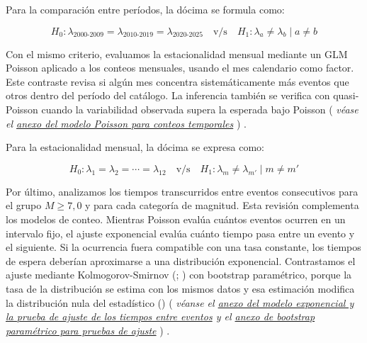 \documentclass[
  spanish,
  letterpaper,
  DIV=11,
  numbers=noendperiod]{scrartcl}
\newcommand{\asesoriaParenRef}[1]{%
  \textnormal{\textcolor{asesoriaTextColor}{(}}%
  {\hypersetup{linkcolor=asesoriaLinkColor,urlcolor=asesoriaLinkColor,citecolor=asesoriaLinkColor}\textcolor{asesoriaTextColor}{\emph{#1}}}%
  \textnormal{\textcolor{asesoriaTextColor}{)}}%
}
\begin{document}
Para la comparación entre períodos, la dócima se formula como:

\begingroup
\setlength{\abovedisplayskip}{0pt}
\setlength{\belowdisplayskip}{0pt}
\setlength{\abovedisplayshortskip}{0pt}
\setlength{\belowdisplayshortskip}{0pt}
\vspace{-1.10em}
\[
H_0: \lambda_{\text{2000-2009}}=\lambda_{\text{2010-2019}}=\lambda_{\text{2020-2025}}
\quad \text{v/s} \quad
H_1: \lambda_a\neq\lambda_b \mid a \neq b
\]
\vspace{-1.15em}
\endgroup

Con el mismo criterio, evaluamos la estacionalidad mensual mediante un
GLM Poisson aplicado a los conteos mensuales, usando el mes calendario
como factor. Este contraste revisa si algún mes concentra
sistemáticamente más eventos que otros dentro del período del catálogo.
La inferencia también se verifica con quasi-Poisson cuando la
variabilidad observada supera la esperada bajo Poisson
\asesoriaParenRef{véase el \hyperref[sec-anexo-poisson-temporal]{anexo del modelo Poisson para conteos temporales}}.

Para la estacionalidad mensual, la dócima se expresa como:

\begingroup
\setlength{\abovedisplayskip}{0pt}
\setlength{\belowdisplayskip}{0pt}
\setlength{\abovedisplayshortskip}{0pt}
\setlength{\belowdisplayshortskip}{0pt}
\vspace{-1.10em}
\[
H_0: \lambda_1=\lambda_2=\cdots=\lambda_{12}
\quad \text{v/s} \quad
H_1: \lambda_m\neq\lambda_{m'} \mid m \neq m'
\]
\vspace{-1.15em}
\endgroup

Por último, analizamos los tiempos transcurridos entre eventos
consecutivos para el grupo \(M \geq 7{,}0\) y para cada categoría de
magnitud. Esta revisión complementa los modelos de conteo. Mientras
Poisson evalúa cuántos eventos ocurren en un intervalo fijo, el ajuste
exponencial evalúa cuánto tiempo pasa entre un evento y el siguiente. Si
la ocurrencia fuera compatible con una tasa constante, los tiempos de
espera deberían aproximarse a una distribución exponencial. Contrastamos
el ajuste mediante Kolmogorov-Smirnov
(;
) con bootstrap
paramétrico, porque la tasa de la distribución se estima con los mismos
datos y esa estimación modifica la distribución nula del estadístico
()
\asesoriaParenRef{véanse el \hyperref[sec-anexo-exponencial-ks]{anexo del modelo exponencial y la prueba de ajuste de los tiempos entre eventos} y el \hyperref[sec-anexo-bootstrap-parametrico]{anexo de bootstrap paramétrico para pruebas de ajuste}}.
\end{document}

